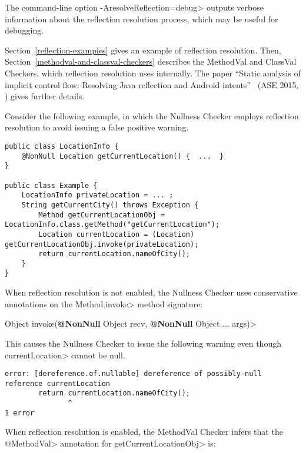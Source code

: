 The command-line option \<-AresolveReflection=debug> outputs verbose
information about the reflection resolution process, which may be useful
for debugging.

Section~\ref{reflection-examples} gives an example of reflection resolution.
Then,
Section~\ref{methodval-and-classval-checkers} describes the MethodVal
and ClassVal Checkers, which reflection resolution uses internally.
The paper ``Static analysis of implicit control flow: Resolving Java reflection and
Android intents''~\cite{BarrosJMVDdAE2015} (ASE 2015,
)
gives further details.



Consider the following example, in which the Nullness Checker employs
reflection resolution to avoid issuing a false positive warning.

\begin{Verbatim}
public class LocationInfo {
    @NonNull Location getCurrentLocation() {  ...  }
}

public class Example {
    LocationInfo privateLocation = ... ;
    String getCurrentCity() throws Exception {
        Method getCurrentLocationObj = LocationInfo.class.getMethod("getCurrentLocation");
        Location currentLocation = (Location) getCurrentLocationObj.invoke(privateLocation);
        return currentLocation.nameOfCity();
    }
}
\end{Verbatim}

When reflection resolution is not enabled, the Nullness Checker uses conservative
annotations on the \<Method.invoke> method signature:

\quad {} Object invoke({\bfseries @NonNull} Object recv, {\bfseries @NonNull} Object ... args)>


This causes the Nullness Checker to issue the following warning even though
\<currentLocation> cannot be null.

\begin{Verbatim}
error: [dereference.of.nullable] dereference of possibly-null reference currentLocation
        return currentLocation.nameOfCity();
               ^
1 error
\end{Verbatim}

\begin{sloppypar}
When reflection resolution is enabled, the MethodVal Checker infers that the \<@MethodVal> annotation for \<getCurrentLocationObj>  is:
\end{sloppypar}

